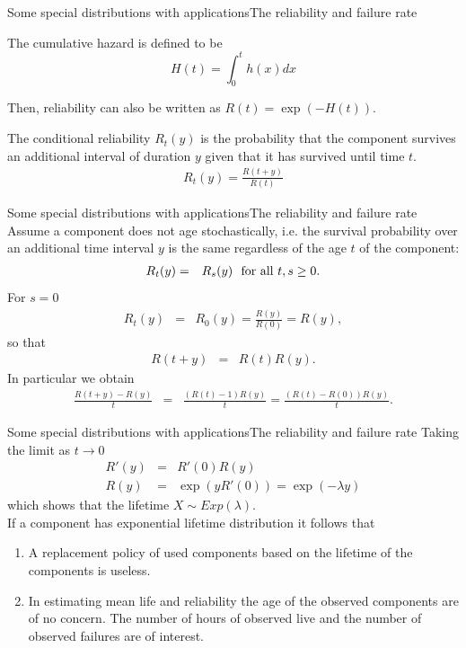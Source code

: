 \documentclass[handout]{beamer}
\begin{document}
\begin{frame}{Some special distributions with applications}{The reliability and failure rate}
 \begin{definition}
  The cumulative hazard is defined to be 
\[
 H(t) = \int_0^t h(x) dx
\]
 \end{definition}
Then, reliability can also be written as $R(t) = \exp(-H(t))$.
\begin{definition}\label{DefConditionalReliability}
The conditional reliability $R_t(y)$ is the probability that the component survives an additional 
interval of duration $y$ given that it has survived until time $t$.
\begin{eqnarray}
 R_t(y) =  \frac{R(t+y)}{R(t)} \label{conditionalReliability}
\end{eqnarray}
 \end{definition}
\end{frame}

\begin{frame}{Some special distributions with applications}{The reliability and failure rate}
Assume a component does not age stochastically, i.e. the survival probability over an additional
time interval $y$ is the same regardless of the age $t$ of the component:
\begin{eqnarray*}
 R_t(y) &=& R_s(y) \textnormal{ \ for all } t,s \geq 0.
\end{eqnarray*}
For $s=0$
\begin{eqnarray*}
 R_t(y) &=& R_0(y) = \frac{R(y)}{R(0)} = R(y),
\end{eqnarray*}
so that
\begin{eqnarray*}
 R(t+y) &=& R(t) R(y).
\end{eqnarray*}
In particular we obtain
\begin{eqnarray*}
 \frac{R(t+y) - R(y)}{t} &=& \frac{(R(t)-1)R(y)}{t}=\frac{(R(t)-R(0))R(y)}{t}.
\end{eqnarray*}
\end{frame}

\begin{frame}{Some special distributions with applications}{The reliability and failure rate}
Taking the limit as $t\rightarrow0$ 
  \begin{eqnarray*}
R'(y) &=& R'(0)R(y) \\
R(y) &=& \exp(yR'(0)) = \exp(-\lambda y)
  \end{eqnarray*}
which shows that the lifetime $X \sim Exp(\lambda)$.\\
If a component has exponential lifetime distribution it follows that
\begin{enumerate}
\item A replacement policy of used components based on the lifetime of the components is useless.
\item In estimating mean life and reliability the age of the observed components are of no concern.
The number of hours of observed live and the number of observed failures are of interest. 
\end{enumerate}

\end{frame}
\end{document}
